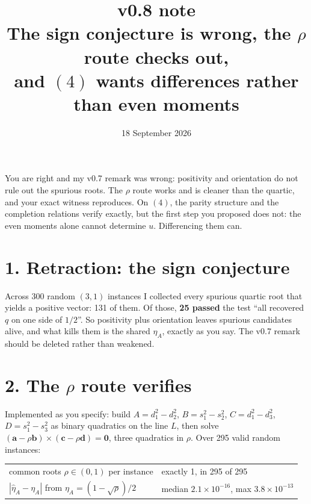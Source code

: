 \documentclass[11pt]{article}
\title{\textbf{v0.8 note}\\[2pt]
\large The sign conjecture is wrong, the $\rho$ route checks out,\\ and $(4)$ wants differences rather than even moments}
\author{18 September 2026}
\date{}
\theoremstyle{remark}
\begin{document}
\maketitle
\vspace{-2.5em}

You are right and my v0.7 remark was wrong: positivity and orientation do not rule out the spurious roots. The $\rho$ route works and is cleaner than the quartic, and your exact witness reproduces. On $(4)$, the parity structure and the completion relations verify exactly, but the first step you proposed does not: the even moments alone cannot determine $u$. Differencing them can.

\section*{1. Retraction: the sign conjecture}

Across 300 random $(3,1)$ instances I collected every spurious quartic root that yields a positive vector: 131 of them. Of those, \textbf{25 passed} the test ``all recovered $q$ on one side of $1/2$''. So positivity plus orientation leaves spurious candidates alive, and what kills them is the shared $\eta_A$, exactly as you say. The v0.7 remark should be deleted rather than weakened.

\section*{2. The $\rho$ route verifies}

Implemented as you specify: build $A=d_1^2-d_2^2$, $B=s_1^2-s_2^2$, $C=d_1^2-d_3^2$, $D=s_1^2-s_3^2$ as binary quadratics on the line $L$, then solve $(\mathbf a-\rho\mathbf b)\times(\mathbf c-\rho\mathbf d)=\mathbf0$, three quadratics in $\rho$. Over 295 valid random instances:

\begin{center}\small
\begin{tabular}{@{}ll@{}}
\toprule
common roots $\rho\in(0,1)$ per instance & exactly 1, in 295 of 295\\
$|\hat\eta_A-\eta_A|$ from $\eta_A=(1-\sqrt{\rho})/2$ & median $2.1\times10^{-16}$, max $3.8\times10^{-13}$\\
\bottomrule
\end{tabular}
\end{center}
\end{document}
